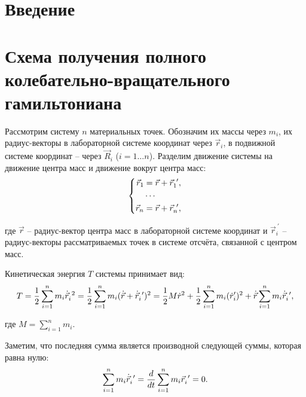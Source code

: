 \documentclass[12pt]{article}
\begin{document}
\section{Введение}

\section{Схема получения полного колебательно-вращательного гамильтониана}

\hspace{0.35cm} Рассмотрим систему $n$ материальных точек. Обозначим их массы через $m_i$, их радиус-векторы в лабораторной системе координат через $\vec{r}_i$, в подвижной системе координат -- через $\vec{R}_i$ ($i = 1 \dots n$). Разделим движение системы на движение центра масс и движение вокруг центра масс:
\vspace*{-0.1cm}
\begin{gather}
\left\{
\begin{aligned}
\vec{r}_1 &= \vec{r} + \vec{r}_1^{\ \prime}, \\
&\cdots \\
\vec{r}_n &= \vec{r} + \vec{r}_n^{\ \prime},
\end{aligned}
\right. \notag
\end{gather}

\hspace*{-0.75cm} где $\vec{r}$ -- радиус-вектор центра масс в лабораторной системе координат и $\vec{r}_i^{\ \prime}$ -- радиус-векторы рассматриваемых точек в системе отсчёта, связанной с центром масс.

Кинетическая энергия $T$ системы принимает вид: 
\vspace*{-0.1cm}
\begin{gather}
T = \frac{1}{2} \sum_{i=1}^{n} m_i \dot{\vec{r}}_i^{\ 2} = \frac{1}{2} \sum_{i=1}^{n} m_i (\dot{\vec{r}} + \dot{\vec{r}}_i^{\ \prime})^2  = \frac{1}{2} M \dot{r}^2 + \frac{1}{2} \sum_{i=1}^{n} m_i ( \dot{r}_i^\prime)^2 + \dot{\vec{r}} \sum_{i=1}^{n} m_i \dot{\vec{r}}_i^{\ \prime}, \notag
\end{gather}

\hspace*{-0.75cm} где $M = \sum_{i=1}^{n} m_i$.

Заметим, что последняя сумма является производной следующей суммы, которая равна нулю: 
\vspace*{-0.1cm}
\begin{gather}
\sum_{i=1}^{n} m_i \dot{\vec{r}}_i^{\ \prime} = \frac{d}{dt} \sum_{i=1}^{n} m_i \vec{r}_i^{\ \prime} = 0. \notag
\end{gather}
\end{document}
